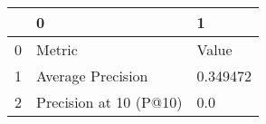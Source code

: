 \begin{tabular}{lll}
\toprule
{} &                       0 &         1 \\
\midrule
0 &                  Metric &     Value \\
1 &       Average Precision &  0.349472 \\
2 &  Precision at 10 (P@10) &       0.0 \\
\bottomrule
\end{tabular}
